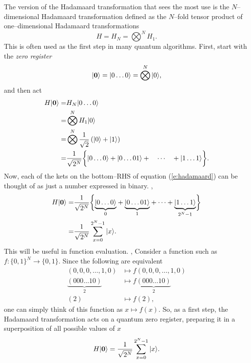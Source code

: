 The version of the Hadamaard transformation that sees the most use is
the $N$--dimensional Hadamaard transformation defined as the $N$--fold
tensor product of one--dimensional Hadamaard transformations
\begin{equation}
H= H_N= \bigotimes^N H_1.
\end{equation}
This is often used as the first step in many quantum algorithms.
First, start with the \emph{zero register} 
\begin{equation}
{|{\bf 0}\rangle}={|{0\ldots 0}\rangle} = \bigotimes^N{|{0}\rangle},
\end{equation} and then act
\begin{equation}
\begin{split}
H{|{\bf 0}\rangle} =& H_N{|{0\ldots 0}\rangle}\\
=& \bigotimes^N H_1{|{0}\rangle}\\
=& \bigotimes^N \frac{1}{\sqrt{2}}\left({|{0}\rangle} +{|{1}\rangle}\right)\\
=& \frac{1}{\sqrt{2^N}}\biggl\lbrace {|{0\ldots 0}\rangle} + {|{0\ldots 01}\rangle} +
\quad\cdots\quad + {|{1\ldots 1}\rangle}\biggr\rbrace.
\end{split}
\label{e:hadamaard}
\end{equation}
Now, each of the kets on the bottom--RHS of equation (\ref{e:hadamaard})
can be thought of as just a number expressed in binary. \ie,
\begin{equation}
\begin{split}
H{|{\bf 0}\rangle} =& \frac{1}{\sqrt{2^N}}\biggl\lbrace 
\underset{0}{\underbrace{{|{0\ldots 0}\rangle}}}
+ \underset{1}{\underbrace{{|{0\ldots 01}\rangle}}} + \cdots 
+ \underset{2^N-1}{\underbrace{{|{1\ldots 1}\rangle}}}\biggr\rbrace \\
=& \frac{1}{\sqrt{2^N}}\sum_{x=0}^{2^N-1} {|{x}\rangle}.
\end{split}
\end{equation}
This will be useful in function evaluation. 
\ie, Consider a function such as $f\colon\lbrace 0,1\rbrace^N\to\lbrace 
0,1\rbrace$.
Since the following are equivalent
\begin{equation}
\begin{split}
(0,0,0,\ldots,1,0)&\mapsto f(0,0,0,\ldots,1,0)\\
\underset{2}{\underbrace{(000\ldots 10)}}&
\mapsto f\underset{2}{\underbrace{(000\ldots 10)}}\\
(2)&\mapsto f(2),
\end{split}
\end{equation}
one can simply think of this function as $x\mapsto f(x)$.
So, as a first step, the Hadamaard transformation acts on a quantum 
zero register, preparing it in a superposition of all possible values 
of $x$
\begin{equation}
H{|{\bf 0}\rangle} = \frac{1}{\sqrt{2^N}}\sum_{x=0}^{2^N-1} {|{x}\rangle}.
\end{equation}


